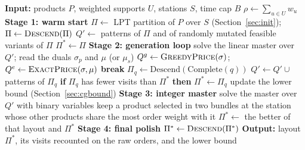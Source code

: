 \documentclass[]{interact}
\begin{document}
\begin{algorithm}[H]
\caption{Price-and-complete drive for the set-partitioning master}
\label{alg:cgdrive}
\begin{algorithmic}[1]
\State \textbf{Input:} products $P$, weighted supports $U$, stations $S$, time cap $B$
\State $\rho\gets\sum_{u\in U}w_u$ 
\Statex
\State \textbf{Stage 1: warm start}
\State $\Pi\gets$ LPT partition of $P$ over $S$ (Section~\ref{sec:init}); $\Pi\gets\Call{Descend}{\Pi}$
\State $Q'\gets$ patterns of $\Pi$ and of randomly mutated feasible variants of $\Pi$
\State $\Pi^{\ast}\gets\Pi$
\Statex
\State \textbf{Stage 2: generation loop}
  \State solve the linear master over $Q'$; read the duals $\sigma_p$ and $\mu$ (or $\mu_s$) 
  \State $Q^{g}\gets\Call{GreedyPrice}{\sigma}$; $Q^{e}\gets\Call{ExactPrice}{\sigma,\mu}$
    \State \textbf{break} 
  \EndIf
    \State $\Pi_q \gets \mathrm{Descend}(\mathrm{Complete}(q))$
      \State $Q'\gets Q'\cup$ patterns of $\Pi_q$
      \State \textbf{if} $\Pi_q$ has fewer visits than $\Pi^{\ast}$ \textbf{then} $\Pi^{\ast}\gets\Pi_q$
    \EndIf
  \EndFor
  \State update the lower bound (Section~\ref{sec:cgbound})
\EndWhile
\Statex
\State \textbf{Stage 3: integer master}
\State solve the master over $Q'$ with binary variables
\State keep a product selected in two bundles at the station whose other products share the most order weight with it 
\State $\Pi^{\ast}\gets$ the better of that layout and $\Pi^{\ast}$
\Statex
\State \textbf{Stage 4: final polish}
\State $\Pi^{\ast}\gets\Call{Descend}{\Pi^{\ast}}$
\State \textbf{Output:} layout $\Pi^{\ast}$, its visits recounted on the raw orders, and the lower bound
\end{algorithmic}
\end{algorithm}
\end{document}
